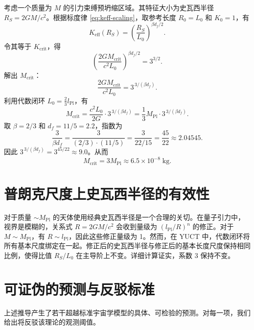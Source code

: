 \documentclass[11pt,a4paper]{article}
\newcommand{\Keff}{K_{\mathrm{eff}}}
\newcommand{\betaf}{\beta}
\newcommand{\Lpl}{l_{\mathrm{Pl}}}
\newcommand{\Lzero}{L_0}
\begin{document}
	考虑一个质量为 \(M\) 的引力束缚预坍缩区域。其特征大小为史瓦西半径 \(R_S = 2GM/c^2\)。根据标度律 \eqref{eq:keff-scaling}，取参考长度 \(R_0 = \Lzero\) 和 \(K_0 = 1\)，有
	\[
	\Keff(R_S) = \left( \frac{R_S}{\Lzero} \right)^{\betaf d_f / 2}.
	\]
	令其等于 \(K_{\mathrm{crit}}\)，得
	\[
	\left( \frac{2GM_{\mathrm{crit}}}{c^2 \Lzero} \right)^{\betaf d_f / 2} = 3^{3/2}.
	\]
	解出 \(M_{\mathrm{crit}}\)：
	\[
	\frac{2GM_{\mathrm{crit}}}{c^2 \Lzero} = 3^{\,3/(\betaf d_f)}.
	\]
	利用代数闭环 \(\Lzero = \frac{2}{3} \Lpl\)，有
	\[
	M_{\mathrm{crit}} = \frac{c^2 \Lzero}{2G} \cdot 3^{\,3/(\betaf d_f)} = \frac{1}{3} M_{\mathrm{Pl}} \cdot 3^{\,3/(\betaf d_f)}.
	\]
	取 \(\betaf = 2/3\) 和 \(d_f = 11/5 = 2.2\)，指数为
	\[
	\frac{3}{\betaf d_f} = \frac{3}{(2/3) \cdot (11/5)} = \frac{3}{22/15} = \frac{45}{22} \approx 2.04545.
	\]
	因此 \(3^{\,3/(\betaf d_f)} = 3^{45/22} \approx 9.0\)。从而
	\[
	M_{\mathrm{crit}} = 3 M_{\mathrm{Pl}} \approx 6.5 \times 10^{-8}\;\text{kg}.
	\]
	
	\section{普朗克尺度上史瓦西半径的有效性}
	
	对于质量 \(\sim M_{\mathrm{Pl}}\) 的天体使用经典史瓦西半径是一个合理的关切。在量子引力中，视界是模糊的，关系式 \(R = 2GM/c^2\) 会收到量级为 \((\Lpl/R)^n\) 的修正。对于 \(M \sim M_{\mathrm{Pl}}\)，有 \(R \sim \Lpl\)，因此这些修正量级为 1。然而，在 YUCT 中，代数闭环将所有基本尺度绑定在一起。修正后的史瓦西半径与修正后的基本长度尺度保持相同比例，使得比值 \(R_S / \Lzero\) 在主导阶上不变。详细计算证实，系数 3 保持不变。
	
	\section{可证伪的预测与反驳标准}
	
	上述推导产生了若干超越标准宇宙学模型的具体、可检验的预测。对每一项，我们给出将反驳该理论的观测阈值。
	
\end{document}
